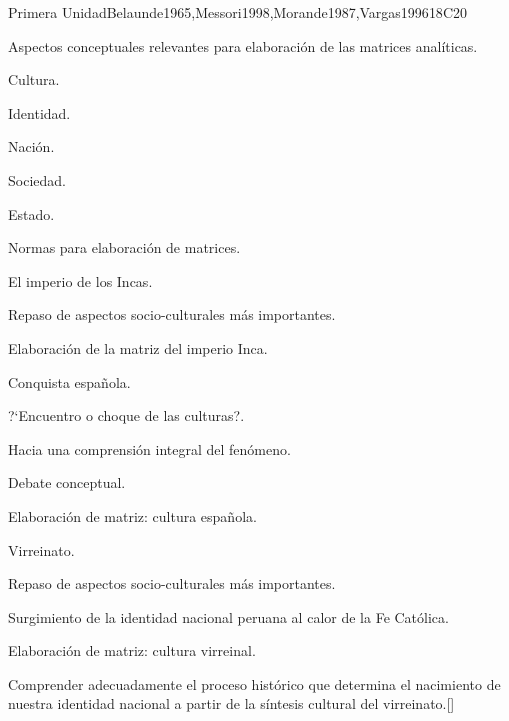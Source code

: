 \begin{syllabus}
\begin{unit}{}{Primera Unidad}{Belaunde1965,Messori1998,Morande1987,Vargas1996}{18}{C20}
\begin{topics}
	\item Aspectos conceptuales relevantes para elaboración de las matrices analíticas.
	    \begin{subtopics}
		\item Cultura.
		\item Identidad.
		\item Nación.
		\item Sociedad.
		\item Estado.
		\item Normas para elaboración de matrices.
	    \end{subtopics}
	\item El imperio de los Incas.
	     \begin{subtopics}
		\item Repaso de  aspectos socio-culturales más importantes.
		\item Elaboración de la matriz del imperio Inca.
	     \end{subtopics}
	\item Conquista española.
	    \begin{subtopics}
		\item ?`Encuentro o choque de las culturas?.
		\item Hacia una comprensión integral del fenómeno.
		\item Debate conceptual.
		\item Elaboración de matriz: cultura española.
	    \end{subtopics}
	\item Virreinato.
	    \begin{subtopics}
		\item Repaso de  aspectos socio-culturales más importantes.
		\item Surgimiento de la identidad nacional peruana al calor de la Fe Católica.
		\item Elaboración de matriz: cultura virreinal.	
	    \end{subtopics}
\end{topics}
\begin{learningoutcomes}
	\item Comprender adecuadamente el proceso histórico que determina el nacimiento de nuestra identidad nacional a partir de la síntesis cultural del virreinato.[\Familiarity]
\end{learningoutcomes}
\end{unit}


\end{syllabus}
